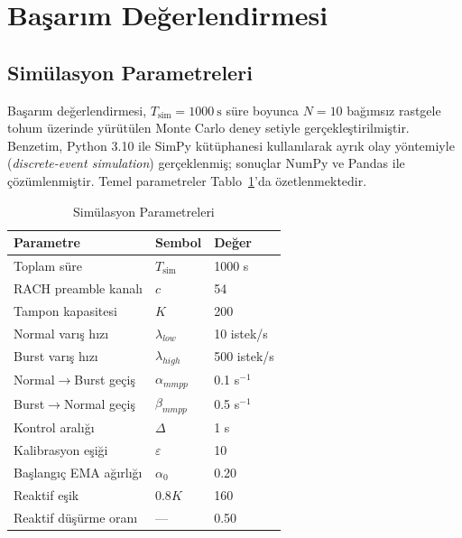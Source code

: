 \documentclass[conference]{IEEEtran}
\begin{document}
\section{Başarım Değerlendirmesi}

\subsection{Simülasyon Parametreleri}

Başarım değerlendirmesi, $T_{\mathrm{sim}} = 1000\ \mathrm{s}$ süre boyunca
$N = 10$ bağımsız rastgele tohum üzerinde yürütülen Monte Carlo deney setiyle
gerçekleştirilmiştir. Benzetim, Python 3.10 ile SimPy kütüphanesi kullanılarak
ayrık olay yöntemiyle (\emph{discrete-event simulation}) gerçeklenmiş; sonuçlar
NumPy ve Pandas ile çözümlenmiştir. Temel parametreler Tablo~\ref{tab:params}'da
özetlenmektedir.

\begin{table}[t]
\caption{Simülasyon Parametreleri}
\label{tab:params}
\begin{center}
\begin{tabular}{lll}
\toprule
\textbf{Parametre} & \textbf{Sembol} & \textbf{Değer} \\
\midrule
Toplam süre              & $T_{\mathrm{sim}}$ & 1000 s \\
RACH preamble kanalı     & $c$                & 54 \\
Tampon kapasitesi        & $K$                & 200 \\
Normal varış hızı        & $\lambda_{low}$    & 10 istek/s \\
Burst varış hızı         & $\lambda_{high}$   & 500 istek/s \\
Normal$\to$Burst geçiş  & $\alpha_{mmpp}$    & 0.1 s$^{-1}$ \\
Burst$\to$Normal geçiş  & $\beta_{mmpp}$     & 0.5 s$^{-1}$ \\
Kontrol aralığı          & $\Delta$           & 1 s \\
Kalibrasyon eşiği        & $\varepsilon$      & 10 \\
Başlangıç EMA ağırlığı  & $\alpha_0$         & 0.20 \\
Reaktif eşik             & $0.8K$             & 160 \\
Reaktif düşürme oranı    & ---                & 0.50 \\
\bottomrule
\end{tabular}
\end{center}
\end{table}
\end{document}

